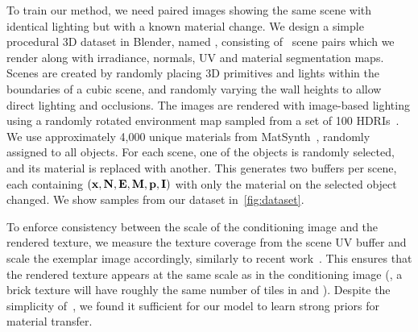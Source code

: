 To train our method, we need paired images showing the same scene with identical lighting but with a known material change.
We design a simple procedural 3D dataset in Blender, named \datasetname, consisting of \nbtotal~scene pairs which we render along with irradiance, normals, UV and material segmentation maps. Scenes are created by randomly placing 3D primitives and lights within the boundaries of a cubic scene, and randomly varying the wall heights to allow direct lighting and occlusions. The images are rendered with image-based lighting \cite{debevec2008rendering} using a randomly rotated environment map sampled from a set of 100 HDRIs~\cite{polyhaven}. We use approximately 4,000 unique materials from MatSynth~\cite{vecchio2023matsynth}, randomly assigned to all objects. For each scene, one of the objects is randomly selected, and its material is replaced with another. This generates two buffers per scene, each containing $\left( \mathbf{x}, \mathbf{N}, \mathbf{E}, \mathbf{M}, \mathbf{p}, \mathbf{I} \right)$ with only the material on the selected object changed. We show samples from our dataset in~\cref{fig:dataset}. 

To enforce consistency between the scale of the conditioning image and the rendered texture, we measure the texture coverage from the scene UV buffer and scale the exemplar image \exemplar accordingly, similarly to recent work~\cite{ma2024materialpicker}. This ensures that the rendered texture appears at the same scale as in the conditioning image (\eg, a brick texture will have roughly the same number of tiles in \exemplar and \image). 
Despite the simplicity of~\datasetname, we found it sufficient for our model to learn strong priors for material transfer. 


